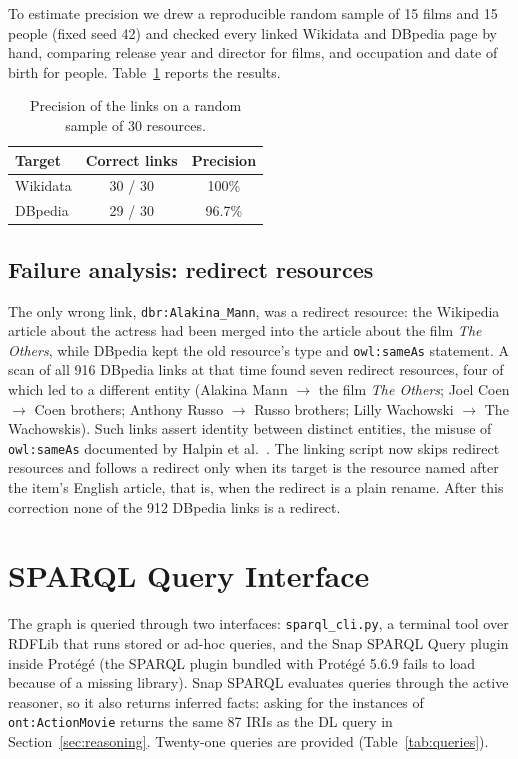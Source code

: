 \documentclass[11pt,a4paper]{article}
\newcommand{\code}[1]{\texttt{#1}}
\begin{document}
To estimate precision we drew a reproducible random sample of 15 films and 15 people (fixed seed 42) and checked every linked Wikidata and DBpedia page by hand, comparing release year and director for films, and occupation and date of birth for people. Table~\ref{tab:precision} reports the results.

\begin{table}[H]
\centering\small
\caption{Precision of the links on a random sample of 30 resources.}\label{tab:precision}
\begin{tabular}{@{}lcc@{}}
\toprule
Target & Correct links & Precision \\
\midrule
Wikidata & 30 / 30 & 100\% \\
DBpedia & 29 / 30 & 96.7\% \\
\bottomrule
\end{tabular}
\end{table}

\subsection{Failure analysis: redirect resources}

The only wrong link, \code{dbr:Alakina\_Mann}, was a redirect resource: the Wikipedia article about the actress had been merged into the article about the film \emph{The Others}, while DBpedia kept the old resource's type and \code{owl:sameAs} statement. A scan of all 916 DBpedia links at that time found seven redirect resources, four of which led to a different entity (Alakina Mann $\rightarrow$ the film \emph{The Others}; Joel Coen $\rightarrow$ Coen brothers; Anthony Russo $\rightarrow$ Russo brothers; Lilly Wachowski $\rightarrow$ The Wachowskis). Such links assert identity between distinct entities, the misuse of \code{owl:sameAs} documented by Halpin et al.~\cite{halpin2010sameas}. The linking script now skips redirect resources and follows a redirect only when its target is the resource named after the item's English article, that is, when the redirect is a plain rename. After this correction none of the 912 DBpedia links is a redirect.

\section{SPARQL Query Interface}\label{sec:sparql}

The graph is queried through two interfaces: \code{sparql\_cli.py}, a terminal tool over RDFLib that runs stored or ad-hoc queries, and the Snap SPARQL Query plugin inside Protégé (the SPARQL plugin bundled with Protégé 5.6.9 fails to load because of a missing library). Snap SPARQL evaluates queries through the active reasoner, so it also returns inferred facts: asking for the instances of \code{ont:ActionMovie} returns the same 87 IRIs as the DL query in Section~\ref{sec:reasoning}. Twenty-one queries are provided (Table~\ref{tab:queries}).
\end{document}
